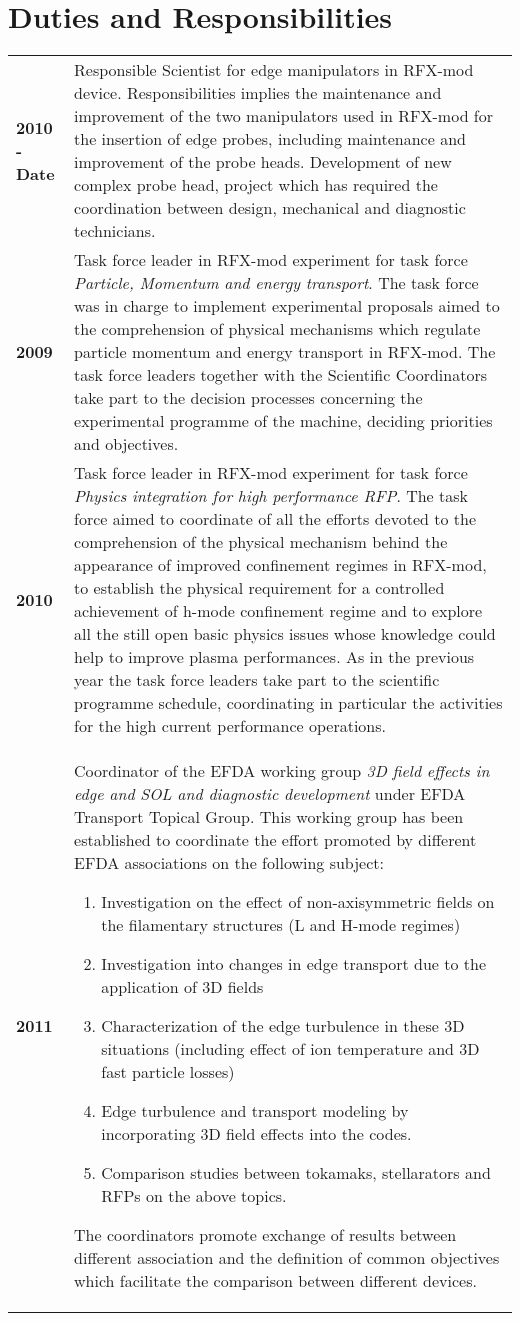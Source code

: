 \section{Duties and Responsibilities}
\begin{longtable}{>{\bfseries}l p{15cm}}
2010 - Date & Responsible Scientist for edge manipulators in RFX-mod
device. Responsibilities implies the maintenance and improvement of
the two manipulators used in RFX-mod for the insertion of edge probes,
including maintenance and improvement of the probe heads. Development of new
complex probe head, project which has required the coordination
between design, mechanical and diagnostic technicians.  \\
2009 & Task force leader in RFX-mod experiment for task force
\emph{Particle, Momentum and energy transport}. The task force was in
charge to implement experimental proposals aimed to the comprehension
of physical mechanisms which regulate particle momentum and energy
transport in RFX-mod. The task force leaders together with the
Scientific Coordinators take part to the decision processes concerning
the experimental programme of the machine, deciding priorities and
objectives. \\
2010 & Task force leader in RFX-mod experiment for task force
\emph{Physics integration for high performance RFP}. The task force
aimed to coordinate of all the efforts devoted to the comprehension of
the physical mechanism behind the  appearance of improved confinement
regimes in RFX-mod, to establish the physical requirement for a controlled achievement  of h-mode confinement regime
and to explore all the still open basic physics issues whose knowledge
could help to improve plasma performances. As in the previous year the
task force leaders take part to the scientific programme schedule,
coordinating in particular the activities for the high current
performance operations. \\
2011 & Coordinator of the EFDA working group \emph{3D field effects in
  edge and SOL and diagnostic development} under EFDA Transport
Topical Group. This working group has been established to
coordinate the effort promoted by different EFDA associations on the
following subject:
\begin{enumerate}
\item Investigation on  the effect of non-axisymmetric fields on the filamentary structures (L and H-mode regimes)
\item Investigation into changes in edge transport due to the application of 3D fields
\item Characterization of the edge turbulence in these 3D situations (including effect of ion temperature and 3D fast particle losses)
\item Edge turbulence and transport modeling by incorporating 3D field effects into the codes.
\item Comparison studies between tokamaks, stellarators and RFPs on the above topics.
\end{enumerate}
The coordinators promote exchange of results between different
association and the definition of common objectives which facilitate
the comparison between different devices.
\end{longtable}
